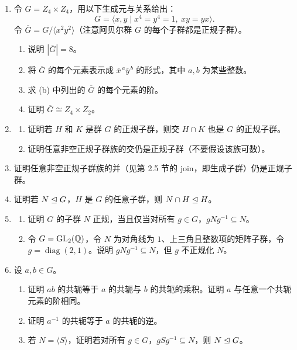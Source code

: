 \begin{enumerate}[label=\arabic*.]
\begin{enumerate}[label=(\alph*)]
    \item 求 $\overline G$ 中每个元素的阶。
    \item 证明 $\overline G\cong\ZZ/12\ZZ$。
  \end{enumerate}
  \item 令 $G=Z_4\times Z_4$，用以下生成元与关系给出：
  \[
    G=\langle x,y\mid x^4=y^4=1,
    \ xy=yx\rangle.
  \]
  令 $\overline G=G/\langle x^2y^2\rangle$（注意阿贝尔群 $G$ 的每个子群都是正规子群）。
  \begin{enumerate}[label=(\alph*)]
    \item 说明 $|\overline G|=8$。
    \item 将 $\overline G$ 的每个元素表示成 $\overline x^{\,a}\overline y^{\,b}$ 的形式，其中 $a,b$ 为某些整数。
    \item 求 (b) 中列出的 $\overline G$ 的每个元素的阶。
    \item 证明 $\overline G\cong Z_4\times Z_2$。
  \end{enumerate}
  \item \begin{enumerate}[label=(\alph*)]
    \item 证明若 $H$ 和 $K$ 是群 $G$ 的正规子群，则交 $H\cap K$ 也是 $G$ 的正规子群。
    \item 证明任意非空正规子群族的交仍是正规子群（不要假设该族可数）。
  \end{enumerate}
  \item 证明任意非空正规子群族的并（见第 2.5 节的 join，即生成子群）仍是正规子群。
  \item 证明若 $N\trianglelefteq G$，$H$ 是 $G$ 的任意子群，则 $N\cap H\trianglelefteq H$。
  \item \begin{enumerate}[label=(\alph*)]
    \item 证明 $G$ 的子群 $N$ 正规，当且仅当对所有 $g\in G$，$gNg^{-1}\subseteq N$。
    \item 令 $G=\operatorname{GL}_2(\mathbb{Q})$，令 $N$ 为对角线为 $1$、上三角且整数项的矩阵子群，令 $g=\operatorname{diag}(2,1)$。说明 $gNg^{-1}\subseteq N$，但 $g$ 不正规化 $N$。
  \end{enumerate}
  \item 设 $a,b\in G$。
  \begin{enumerate}[label=(\alph*)]
    \item 证明 $ab$ 的共轭等于 $a$ 的共轭与 $b$ 的共轭的乘积。证明 $a$ 与任意一个共轭元素的阶相同。
    \item 证明 $a^{-1}$ 的共轭等于 $a$ 的共轭的逆。
    \item 若 $N=\langle S\rangle$，证明若对所有 $g\in G$，$gSg^{-1}\subseteq N$，则 $N\trianglelefteq G$。

\end{enumerate}
\end{enumerate}
